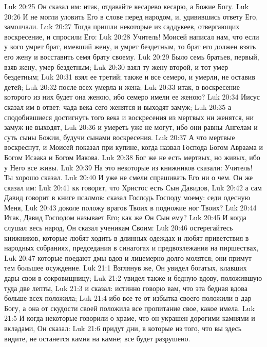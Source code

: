 \vs Luk 20:25 Он сказал им: итак, отдавайте кесарево кесарю, а Божие Богу.
\vs Luk 20:26 И не могли уловить Его в слове перед народом, и, удивившись ответу Его, замолчали.
\rsbpar\vs Luk 20:27 Тогда пришли некоторые из саддукеев, отвергающих воскресение, и спросили Его:
\vs Luk 20:28 Учитель! Моисей написал нам, что если у кого умрет брат, имевший жену, и умрет бездетным, то брат его должен взять его жену и восставить семя брату своему.
\vs Luk 20:29 Было семь братьев, первый, взяв жену, умер бездетным;
\vs Luk 20:30 взял ту жену второй, и тот умер бездетным;
\vs Luk 20:31 взял ее третий; также и все семеро, и умерли, не оставив детей;
\vs Luk 20:32 после всех умерла и жена;
\vs Luk 20:33 итак, в воскресение которого из них будет она женою, ибо семеро имели ее женою?
\vs Luk 20:34 Иисус сказал им в ответ: чада века сего женятся и выходят замуж;
\vs Luk 20:35 а сподобившиеся достигнуть того века и воскресения из мертвых ни женятся, ни замуж не выходят,
\vs Luk 20:36 и умереть уже не могут, ибо они равны Ангелам и суть сыны Божии, будучи сынами воскресения.
\vs Luk 20:37 А что мертвые воскреснут, и Моисей показал при купине, когда назвал Господа Богом Авраама и Богом Исаака и Богом Иакова.
\vs Luk 20:38 Бог же не есть  мертвых, но живых, ибо у Него все живы.
\vs Luk 20:39 На это некоторые из книжников сказали: Учитель! Ты хорошо сказал.
\vs Luk 20:40 И уже не смели спрашивать Его ни о чем. Он же сказал им:
\vs Luk 20:41 кк говорят, что Христос есть Сын Давидов,
\vs Luk 20:42 а сам Давид говорит в книге псалмов: сказал Господь Господу моему: седи одесную Меня,
\vs Luk 20:43 доколе положу врагов Твоих в подножие ног Твоих?
\vs Luk 20:44 Итак, Давид Господом называет Его; как же Он Сын ему?
\vs Luk 20:45 И когда слушал весь народ, Он сказал ученикам Своим:
\vs Luk 20:46 остерегайтесь книжников, которые любят ходить в длинных одеждах и любят приветствия в народных собраниях, председания в синагогах и предвозлежания на пиршествах,
\vs Luk 20:47 которые поедают дмы вдов и лицемерно долго молятся; они примут тем большее осуждение.
\vs Luk 21:1 Взглянув же, Он увидел богатых, клавших дары свои в сокровищницу;
\vs Luk 21:2 увидел также и бедную вдову, положившую туда две лепты,
\vs Luk 21:3 и сказал: истинно говорю вам, что эта бедная вдова больше всех положила;
\vs Luk 21:4 ибо все те от избытка своего положили в дар Богу, а она от скудости своей положила все пропитание свое, какое имела.
\rsbpar\vs Luk 21:5 И когда некоторые говорили о храме, что он украшен дорогими камнями и вкладами, Он сказал:
\vs Luk 21:6 придут дни, в которые из того, что вы здесь видите, не останется камня на камне; все будет разрушено.

